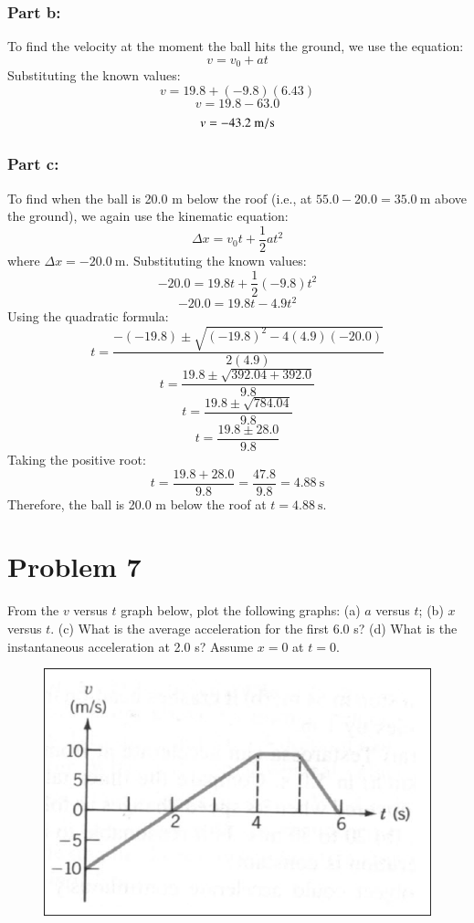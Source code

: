 \documentclass{article}
\begin{document}
\subsubsection*{Part b:}
To find the velocity at the moment the ball hits the ground, we use the equation:
\[
	v = v_0 + at
\]
Substituting the known values:
\[
	v = 19.8 + (-9.8)(6.43)
\]
\[
	v = 19.8 - 63.0
\]
\[
	v = -43.2\ \unit{{\meter\per\second}}
\]

\subsubsection*{Part c:}
To find when the ball is 20.0 m below the roof (i.e., at $55.0 - 20.0 = 35.0\ \unit{\meter}$ above the ground), we again use the kinematic equation:
\[
	\Delta x = v_0 t + \frac{1}{2} at^2
\]
where $\Delta x = -20.0\ \unit{\meter}$. Substituting the known values:
\[
	-20.0 = 19.8t + \frac{1}{2}(-9.8)t^2
\]
\[
	-20.0 = 19.8t - 4.9t^2
\]
Using the quadratic formula:
\[
	t = \frac{-(-19.8) \pm \sqrt{(-19.8)^2 - 4(4.9)(-20.0)}}{2(4.9)}
\]
\[
	t = \frac{19.8 \pm \sqrt{392.04 + 392.0}}{9.8}
\]
\[
	t = \frac{19.8 \pm \sqrt{784.04}}{9.8}
\]
\[
	t = \frac{19.8 \pm 28.0}{9.8}
\]
Taking the positive root:
\[
	t = \frac{19.8 + 28.0}{9.8} = \frac{47.8}{9.8} = 4.88\ \unit{\second}
\]
Therefore, the ball is 20.0 m below the roof at $t = 4.88\ \unit{\second}$.


\section*{Problem 7}
From the $v$ versus $t$ graph below, plot the following graphs: (a) $a$ versus $t$; (b) $x$ versus $t$.
(c) What is the average acceleration for the first 6.0 s? (d) What is the instantaneous
acceleration at 2.0 s? Assume $x = 0$ at $t = 0$.

\begin{figure}[ht]
    \centering
    \includegraphics[scale=0.5]{graph-3.png}
\end{figure}
\end{document}
